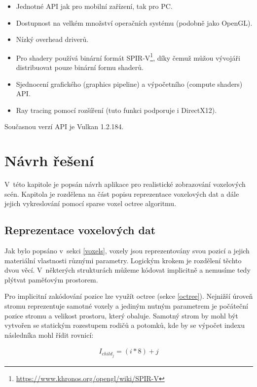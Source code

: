 \begin{itemize}
	\item Jednotné API jak pro mobilní zařízení, tak pro PC.
	\item Dostupnost na velkém množství operačních systému (podobně jako OpenGL).
	\item Nízký overhead driverů.
	\item Pro shadery používá binární formát SPIR-V\footnote{\url{https://www.khronos.org/opengl/wiki/SPIR-V}}, díky čemuž můžou vývojáři distribuovat pouze binární formu shaderů.
	\item Sjednocení grafického (graphics pipeline) a výpočetního (compute shaders) API.
	\item Ray tracing pomocí rozšíření (tuto funkci podporuje i DirectX12).
\end{itemize}

Současnou verzí API je Vulkan 1.2.184\cite{vulkanspec}.

\chapter{Návrh řešení}
\label{navrh}
V~této kapitole je popsán návrh aplikace pro realistické zobrazování voxelových scén. Kapitola je rozdělena na část popisu reprezentace voxelových dat a dále jejich vykreslování pomocí sparse voxel octree algoritmu.

\section{Reprezentace voxelových dat}\label{sec:voxel_representation}
Jak bylo popsáno v~sekci \ref{voxels}, voxely jsou reprezentovány svou pozicí a jejich materiální vlastnosti různými parametry. Logickým krokem je rozdělení těchto dvou věcí. V~některých strukturách můžeme kódovat implicitně a nemusíme tedy plýtvat paměťovým prostorem.

Pro implicitní zakódování pozice lze využít octree (sekce \ref{octree}). Nejnižší úroveň stromu reprezentuje samotné voxely a jediným nutným parametrem je počáteční pozice stromu a velikost prostoru, který obaluje. Samotný strom by mohl být vytvořen se statickým rozestupem rodičů a potomků, kde by se výpočet indexu následníka mohl řídit rovnicí:

\begin{equation} \label{eq:simple_octree_index}
	\begin{gathered}
		I_{child_j} = (i * 8) + j
	\end{gathered}
\end{equation}


